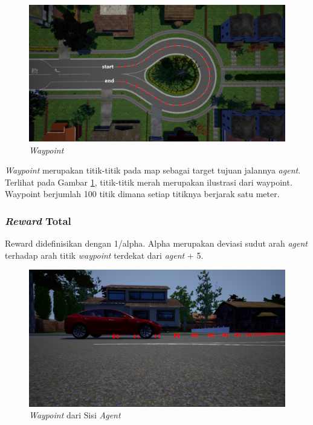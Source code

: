 \begin{figure}[H] 
	\centering
	\includegraphics[width=1\linewidth]{images/waypoint}
	\caption{\textit{Waypoint}}
	\label{fig:waypoint}
\end{figure}

\textit{Waypoint} merupakan titik-titik pada map sebagai target tujuan jalannya \textit{agent}. Terlihat pada Gambar \ref{fig:waypoint}, titik-titik merah merupakan ilustrasi dari waypoint. Waypoint berjumlah 100 titik dimana setiap titiknya berjarak satu meter.

\subsubsection{\textit{Reward} Total}
Reward didefinisikan dengan 1/alpha. Alpha merupakan deviasi sudut arah \textit{agent }terhadap arah titik \textit{waypoint} terdekat dari \textit{agent} + 5.

\begin{figure}[H] 
	\centering
	\includegraphics[width=1\linewidth]{images/waypoint_fromside}
	\caption{\textit{Waypoint }dari Sisi \textit{Agent}}
	\label{fig:waypoint_fromside}
\end{figure}

